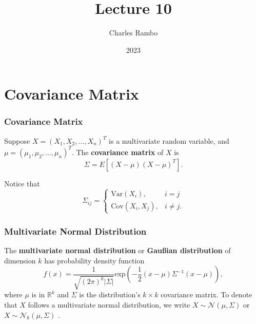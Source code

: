 \documentclass{beamer}
\title{Lecture 10}
\author{Charles Rambo}
\institute{UCLA Anderson School of Management}
\date{2023}
\begin{document}
\insertTitleSlide



\section{Covariance Matrix}

\begin{frame}
\frametitle{Covariance Matrix}
\small
\begin{Definition}
Suppose $X = \left(X_1, X_2,\ldots, X_n\right)^T$ is a multivariate random variable, and $\mu = (\mu_1, \mu_2,\ldots,\mu_n)^T$. The {\bf covariance matrix} of $X$ is
$$
\Sigma = E\left[(X - \mu) (X - \mu)^T\right].
$$
\end{Definition}
Notice that
$$
\Sigma_{ij} = \begin{cases} \text{Var}(X_i),	& i = j\\ \text{Cov}(X_i, X_j),	&	i\neq j.\end{cases}
$$
\end{frame}

\begin{frame}
\frametitle{Multivariate Normal Distribution}
\begin{Definition}
The {\bf multivariate normal distribution} or {\bf Gau\ss ian distribution} of dimension $k$ has probability density function
$$
f(x) = \frac{1}{\sqrt{ (2\pi)^k |\Sigma|}} \text{exp}\left(-\frac{1}{2}\left(x - \mu\right)\Sigma^{-1}(x - \mu)\right),
$$
where $\mu$ is in $\mathbb{R}^k$ and $\Sigma$ is the distribution's $k\times k$ covariance matrix. To denote that $X$ follows a multivariate normal distribution, we write $X\sim{\mathcal{N}(\mu, \Sigma)}$ or $X\sim{\mathcal{N}_k(\mu, \Sigma)}$ .
\end{Definition}

\end{frame}
\end{document}
